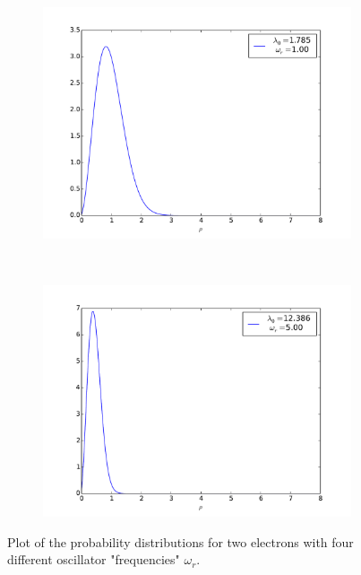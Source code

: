 \documentclass[11pt, a4paper]{article}
\begin{document}
\begin{figure}
\begin{subfigure}[b]{0.45\textwidth}
					\includegraphics[width=1.1\textwidth]{plot-twoElectrons_1}
				\end{subfigure}
				~ %
				\begin{subfigure}[b]{0.45\textwidth}
					\includegraphics[width=1.1\textwidth]{plot-twoElectrons_5}
				\end{subfigure}
				\caption{Plot of the probability distributions for two electrons with four different oscillator "frequencies" $\omega_r$. }\label{fig: plot two electrons}
			\end{figure}
			
\end{document}
